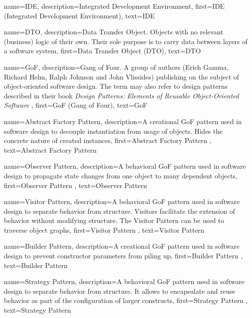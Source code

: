{
    name=IDE,
    description={Integrated Development Environment},
    first={IDE (Integrated Development Environment)},
    text={IDE}
}

{
    name=DTO,
    description={Data Transfer Object. Objects with no relevant (business) logic of their own. Their sole purpose is to carry data between layers of a software system},
    first={Data Transfer Object (DTO)},
    text={DTO}
}

{
    name=GoF,
    description={Gang of Four. A group of authors (Erich Gamma, Richard Helm, Ralph Johnson and John Vlissides) publishing on the subject of object-oriented software design. The term may also refer to design patterns described in their book \textit{Design Patterns: Elements of Reusable Object-Oriented Software} \cite{Gamma:1995:DPE:186897}},
    first={GoF (Gang of Four)},
    text={GoF}
}

{
    name={Abstract Factory Pattern},
    description={A creational \gls{GoF} pattern used in software design to decouple instantiation from usage of objects. Hides the concrete nature of created instances},
    first={Abstract Factory Pattern \cite{Gamma:1995:DPE:186897}},
    text={Abstract Factory Pattern}
}

{
    name={Observer Pattern},
    description={A behavioral \gls{GoF} pattern used in software design to propagate state changes from one object to many dependent objects},
    first={Observer Pattern \cite{Gamma:1995:DPE:186897}},
    text={Observer Pattern}
}

{
    name={Visitor Pattern},
    description={A behavioral \gls{GoF} pattern used in software design to separate behavior from structure. Visitors facilitate the extension of behavior without modifying structure. The Visitor Pattern can be used to traverse object graphs},
    first={Visitor Pattern \cite{Gamma:1995:DPE:186897}},
    text={Visitor Pattern}
}

{
    name={Builder Pattern},
    description={A creational \gls{GoF} pattern used in software design to prevent constructor parameters from piling up},
    first={Builder Pattern \cite{Gamma:1995:DPE:186897}},
    text={Builder Pattern}
}

{
    name={Strategy Pattern},
    description={A behavioral \gls{GoF} pattern used in software design to separate behavior from structure. It allows to encapsulate and reuse behavior as part of the configuration of larger constructs},
    first={Strategy Pattern \cite{Gamma:1995:DPE:186897}},
    text={Strategy Pattern}
}

